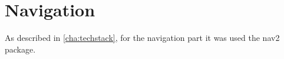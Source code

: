 \chapter{Navigation}

\def\code#1{\texttt{#1}}



As described in \autoref{cha:techstack}, for the navigation part it was used the \Acrshort{nav2} package. 